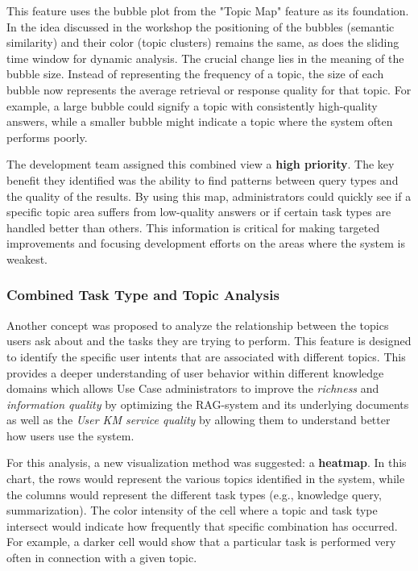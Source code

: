 \documentclass[
	english,
	ruledheaders=section,%
	class=report,%
	thesis={type=bachelor},%
	accentcolor=1b,%
	custommargins=true,%
	marginpar=false,%
	parskip=half-,%
	fontsize=11pt,%
	DIV=14,
]{tudapub}
\begin{document}
This feature uses the bubble plot from the "Topic Map" feature as its foundation. In the idea discussed in the workshop the positioning of the bubbles (semantic similarity) and their color (topic clusters) remains the same, as does the sliding time window for dynamic analysis. The crucial change lies in the meaning of the bubble size. Instead of representing the frequency of a topic, the size of each bubble now represents the average retrieval or response quality for that topic. For example, a large bubble could signify a topic with consistently high-quality answers, while a smaller bubble might indicate a topic where the system often performs poorly.

The development team assigned this combined view a \textbf{high priority}. The key benefit they identified was the ability to find patterns between query types and the quality of the results. By using this map, administrators could quickly see if a specific topic area suffers from low-quality answers or if certain task types are handled better than others. This information is critical for making targeted improvements and focusing development efforts on the areas where the system is weakest.
\subsubsection{Combined Task Type and Topic Analysis}
Another concept was proposed to analyze the relationship between the topics users ask about and the tasks they are trying to perform. This feature is designed to identify the specific user intents that are associated with different topics. This provides a deeper understanding of user behavior within different knowledge domains which allows Use Case administrators to improve the \textit{richness} and \textit{information quality} by optimizing the RAG-system and its underlying documents as well as the \textit{User KM service quality} by allowing them to understand better how users use the system.

For this analysis, a new visualization method was suggested: a \textbf{heatmap}. In this chart, the rows would represent the various topics identified in the system, while the columns would represent the different task types (e.g., knowledge query, summarization). The color intensity of the cell where a topic and task type intersect would indicate how frequently that specific combination has occurred. For example, a darker cell would show that a particular task is performed very often in connection with a given topic.
\end{document}
